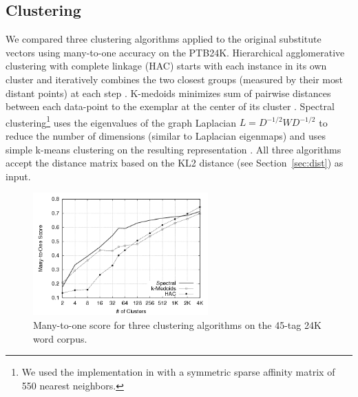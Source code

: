 \subsection{Clustering}
\label{sec:clustering}

We compared three clustering algorithms applied to the original
substitute vectors using many-to-one accuracy on the PTB24K.
Hierarchical agglomerative clustering with complete linkage (HAC)
starts with each instance in its own cluster and iteratively combines
the two closest groups (measured by their most distant points) at each
step \cite{manning2008introduction}.  K-medoids minimizes sum of
pairwise distances between each data-point to the exemplar at the
center of its cluster \cite{kaufman2005finding}.  Spectral
clustering\footnote{We used the implementation in
  \cite{chen2011parallel} with a symmetric sparse affinity matrix of
  550 nearest neighbors.} uses the eigenvalues of the graph Laplacian
$L=D^{-1/2} W D^{-1/2}$ to reduce the number of dimensions (similar to
Laplacian eigenmaps) and uses simple k-means clustering on the
resulting representation \cite{ng2002spectral}.  All three algorithms
accept the distance matrix based on the KL2 distance (see
Section~\ref{sec:dist}) as input.

\begin{figure}[h] \centering
  \includegraphics[width=0.6\textwidth]{clustering_graph_mono.png}
\caption{Many-to-one score for three clustering algorithms on the
  45-tag 24K word corpus.}
\label{fig:clustering}
\end{figure}



